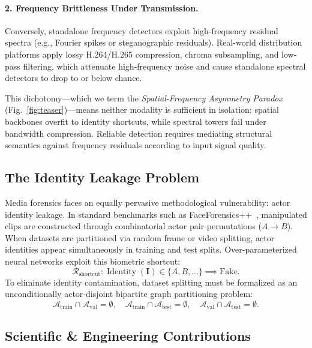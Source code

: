 \documentclass[10pt,twocolumn,letterpaper]{article}
\begin{document}
\paragraph{2. Frequency Brittleness Under Transmission.} Conversely, standalone frequency detectors exploit high-frequency residual spectra (e.g., Fourier spikes or steganographic residuals). Real-world distribution platforms apply lossy H.264/H.265 compression, chroma subsampling, and low-pass filtering, which attenuate high-frequency noise and cause standalone spectral detectors to drop to or below chance.

This dichotomy---which we term the \textit{Spatial-Frequency Asymmetry Paradox} (Fig.~\ref{fig:teaser})---means neither modality is sufficient in isolation: spatial backbones overfit to identity shortcuts, while spectral towers fail under bandwidth compression. Reliable detection requires mediating structural semantics against frequency residuals according to input signal quality.

\subsection{The Identity Leakage Problem}
\label{sec:identity_leakage}

Media forensics faces an equally pervasive methodological vulnerability: actor identity leakage. In standard benchmarks such as FaceForensics++~\cite{roessler2019faceforensicspp}, manipulated clips are constructed through combinatorial actor pair permutations ($A \to B$). When datasets are partitioned via random frame or video splitting, actor identities appear simultaneously in training and test splits. Over-parameterized neural networks exploit this biometric shortcut:
\begin{equation}
\label{eq:shortcut}
\mathcal{R}_{\mathrm{shortcut}} : \operatorname{Identity}(\mathbf{I}) \in \{A, B, \dots\} \implies \text{Fake}.
\end{equation}
To eliminate identity contamination, dataset splitting must be formalized as an unconditionally actor-disjoint bipartite graph partitioning problem:
\begin{equation}
\label{eq:disjoint_sets}
\mathcal{A}_{\mathrm{train}} \cap \mathcal{A}_{\mathrm{val}} = \emptyset, \quad \mathcal{A}_{\mathrm{train}} \cap \mathcal{A}_{\mathrm{test}} = \emptyset, \quad \mathcal{A}_{\mathrm{val}} \cap \mathcal{A}_{\mathrm{test}} = \emptyset.
\end{equation}

\subsection{Scientific \& Engineering Contributions}
\label{sec:contributions}
\end{document}
